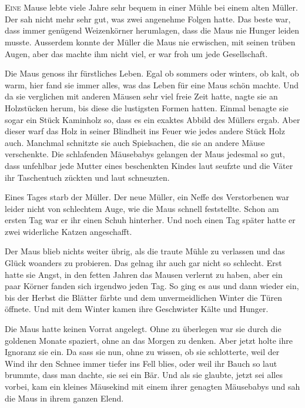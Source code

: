 \chapter*{}
\lettrine[lines=3]{\color{red}E}{ine} Mause lebte viele Jahre sehr bequem in einer Mühle bei einem alten Müller. Der sah nicht mehr sehr gut, was zwei angenehme Folgen hatte. Das beste war, dass immer genügend Weizenkörner herumlagen, dass die Maus nie Hunger leiden musste. Ausserdem konnte der Müller die Maus nie erwischen, mit seinen trüben Augen, aber das machte ihm nicht viel, er war froh um jede Gesellschaft. 

Die Maus genoss ihr fürstliches Leben. Egal ob sommers oder winters, ob kalt, ob warm, hier fand sie immer alles, was das Leben für eine Maus schön machte. Und da sie verglichen mit anderen Mäusen sehr viel freie Zeit hatte, nagte sie an Holzstücken herum, bis diese die lustigsten Formen hatten. Einmal benagte sie sogar ein Stück Kaminholz so, dass es ein exaktes Abbild des Müllers ergab. Aber dieser warf das Holz in seiner Blindheit ins Feuer wie jedes andere Stück Holz auch. Manchmal schnitzte sie auch Spielsachen, die sie an andere Mäuse verschenkte. Die schlafenden Mäusebabys gelangen der Maus jedesmal so gut, dass unfehlbar jede Mutter eines beschenkten Kindes laut seufzte und die Väter ihr Taschentuch zückten und laut schneuzten. 

Eines Tages starb der Müller. Der neue Müller, ein Neffe des Verstorbenen war leider nicht von schlechtem Auge, wie die Maus schnell feststellte. Schon am ersten Tag war er ihr einen Schuh hinterher. Und noch einen Tag später hatte er zwei widerliche Katzen angeschafft. 

Der Maus blieb nichts weiter übrig, als die traute Mühle zu verlassen und das Glück woanders zu probieren. Das gelnag ihr auch gar nicht so schlecht. Erst hatte sie Angst, in den fetten Jahren das Mausen verlernt zu haben, aber ein paar Körner fanden sich irgendwo jeden Tag. So ging es aus und dann wieder ein, bis der Herbst die Blätter färbte und dem unvermeidlichen Winter die Türen öffnete. Und mit dem Winter kamen ihre Geschwister Kälte und Hunger. 

Die Maus hatte keinen Vorrat angelegt. Ohne zu überlegen war sie durch die goldenen Monate spaziert, ohne an das Morgen zu denken. Aber jetzt holte ihre Ignoranz sie ein. Da sass sie nun, ohne zu wissen, ob sie schlotterte, weil der Wind ihr den Schnee immer tiefer ins Fell blies, oder weil ihr Bauch so laut brummte, dass man dachte, sie sei ein Bär. Und als sie glaubte, jetzt sei alles vorbei, kam ein kleines Mäusekind mit einem ihrer genagten Mäusebabys und sah die Maus in ihrem ganzen Elend.

